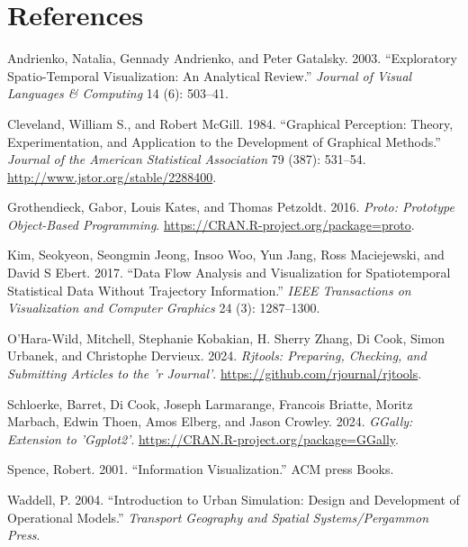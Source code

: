 \hypertarget{references}{%
\section*{References}\label{references}}

\hypertarget{refs}{}
\begin{CSLReferences}{1}{0}
\leavevmode{}%
Andrienko, Natalia, Gennady Andrienko, and Peter Gatalsky. 2003. {``Exploratory Spatio-Temporal Visualization: An Analytical Review.''} \emph{Journal of Visual Languages \& Computing} 14 (6): 503--41.

\leavevmode{}%
Cleveland, William S., and Robert McGill. 1984. {``Graphical Perception: Theory, Experimentation, and Application to the Development of Graphical Methods.''} \emph{Journal of the American Statistical Association} 79 (387): 531--54. \url{http://www.jstor.org/stable/2288400}.

\leavevmode{}%
Grothendieck, Gabor, Louis Kates, and Thomas Petzoldt. 2016. \emph{Proto: Prototype Object-Based Programming}. \url{https://CRAN.R-project.org/package=proto}.

\leavevmode{}%
Kim, Seokyeon, Seongmin Jeong, Insoo Woo, Yun Jang, Ross Maciejewski, and David S Ebert. 2017. {``Data Flow Analysis and Visualization for Spatiotemporal Statistical Data Without Trajectory Information.''} \emph{IEEE Transactions on Visualization and Computer Graphics} 24 (3): 1287--1300.

\leavevmode{}%
O'Hara-Wild, Mitchell, Stephanie Kobakian, H. Sherry Zhang, Di Cook, Simon Urbanek, and Christophe Dervieux. 2024. \emph{Rjtools: Preparing, Checking, and Submitting Articles to the 'r Journal'}. \url{https://github.com/rjournal/rjtools}.

\leavevmode{}%
Schloerke, Barret, Di Cook, Joseph Larmarange, Francois Briatte, Moritz Marbach, Edwin Thoen, Amos Elberg, and Jason Crowley. 2024. \emph{GGally: Extension to 'Ggplot2'}. \url{https://CRAN.R-project.org/package=GGally}.

\leavevmode{}%
Spence, Robert. 2001. {``Information Visualization.''} ACM press Books.

\leavevmode{}%
Waddell, P. 2004. {``Introduction to Urban Simulation: Design and Development of Operational Models.''} \emph{Transport Geography and Spatial Systems/Pergammon Press}.


\end{CSLReferences}
